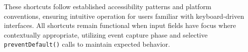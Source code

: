 These shortcuts follow established accessibility patterns and platform conventions, ensuring intuitive operation for users familiar with keyboard-driven interfaces. All shortcuts remain functional when input fields have focus where contextually appropriate, utilizing event capture phase and selective \texttt{preventDefault()} calls to maintain expected behavior.
